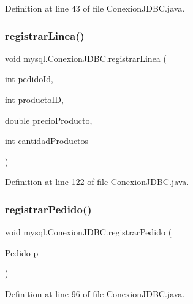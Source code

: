 Definition at line 43 of file Conexion\+J\+D\+B\+C.\+java.

\mbox{\label{classmysql_1_1_conexion_j_d_b_c_ab41e6e25d89ab9a807e9729fcdf5818f}} 
\subsubsection{\texorpdfstring{registrar\+Linea()}{registrarLinea()}}
{\footnotesize\ttfamily void mysql.\+Conexion\+J\+D\+B\+C.\+registrar\+Linea (\begin{DoxyParamCaption}\item[{int}]{pedido\+Id,  }\item[{int}]{producto\+ID,  }\item[{double}]{precio\+Producto,  }\item[{int}]{cantidad\+Productos }\end{DoxyParamCaption})}



Definition at line 122 of file Conexion\+J\+D\+B\+C.\+java.

\mbox{\label{classmysql_1_1_conexion_j_d_b_c_a6d8f0cd0e2046952d9771d379c16562a}} 
\subsubsection{\texorpdfstring{registrar\+Pedido()}{registrarPedido()}}
{\footnotesize\ttfamily void mysql.\+Conexion\+J\+D\+B\+C.\+registrar\+Pedido (\begin{DoxyParamCaption}\item[{\mbox{\hyperlink{classobjetos_1_1_pedido}{Pedido}}}]{p }\end{DoxyParamCaption})}



Definition at line 96 of file Conexion\+J\+D\+B\+C.\+java.

